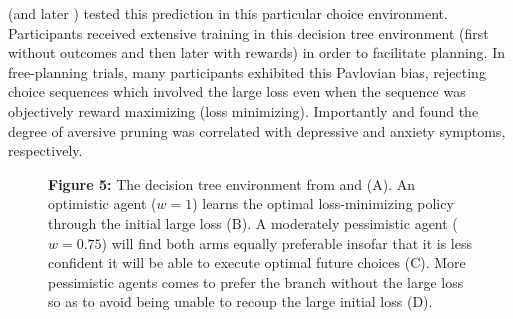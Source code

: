 \documentclass[11pt]{article} %
\begin{document}
\cite{Huys2012} (and later \cite{Lally2017}) tested this prediction in this particular choice environment. Participants received extensive training in this decision tree environment (first without outcomes and then later with rewards) in order to facilitate planning. In free-planning trials, many participants exhibited this Pavlovian bias, rejecting choice sequences which involved the large loss even when the sequence was objectively reward maximizing (loss minimizing). Importantly \cite{Huys2012} and \cite{Lally2017} found the degree of aversive pruning was correlated with depressive and anxiety symptoms, respectively.

\begin{figure}
  \centerline{%
  }
  \par \textbf{Figure 5:} The decision tree environment from \cite{Huys2012} and \cite{Lally2017} (A). An optimistic agent ($w=1$) learns the optimal loss-minimizing policy through the initial large loss (B). A moderately pessimistic agent ($w=0.75$) will find both arms equally preferable insofar that it is less confident it will be able to execute optimal future choices (C). More pessimistic agents comes to prefer the branch without the large loss so as to avoid being unable to recoup the large initial loss (D).
\end{figure}
\end{document}
